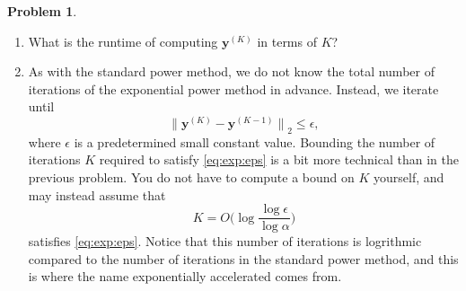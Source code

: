 \documentclass[10pt]{article}
\theoremstyle{definition}
\newtheorem{problem}{Problem}
\newcommand{\y}{\mathbf y}
\newcommand{\ltwo}[1]{{\lVert {#1} \rVert}_2}
\begin{document}
{\begin{problem}
\begin{enumerate}
        \item 
            What is the runtime of computing $\y^{(K)}$ in terms of $K$?
            \vspace{3in}

        \newpage
        \item
            As with the standard power method, we do not know the total number of iterations of the exponential power method in advance.
            Instead, we iterate until
            \begin{equation}
                \label{eq:exp:eps}
                \ltwo{\y^{(K)}-\y^{(K-1)}} \le \epsilon,
            \end{equation}
            where $\epsilon$ is a predetermined small constant value.
            Bounding the number of iterations $K$ required to satisfy \eqref{eq:exp:eps} is a bit more technical than in the previous problem.
            You do not have to compute a bound on $K$ yourself,
            and may instead assume that 
            \begin{equation}
                \label{eq:exp:2}
                K = O\bigg( \log \frac{\log \epsilon}{\log \alpha} \bigg)
            \end{equation}
            satisfies \eqref{eq:exp:eps}.
            Notice that this number of iterations is logrithmic compared to the number of iterations in the standard power method,
            and this is where the name exponentially accelerated comes from.


\end{enumerate}
\end{problem}}
\end{document}
